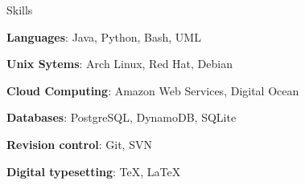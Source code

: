 \begin{cvlist}{Skills}
  \item[\textbf{Languages}:] Java, Python, Bash, UML
  \item[\textbf{Unix Sytems}:] Arch Linux, Red Hat, Debian
  \item[\textbf{Cloud Computing}:] Amazon Web Services, Digital Ocean
  \item[\textbf{Databases}:] PostgreSQL, DynamoDB, SQLite
  \item[\textbf{Revision control}:] Git, SVN
  \item[\textbf{Digital typesetting}:] \TeX, \LaTeX
\end{cvlist}